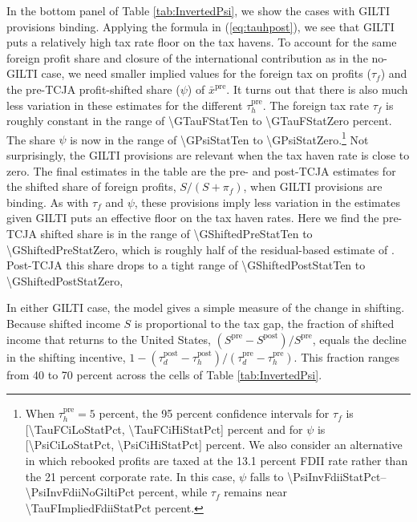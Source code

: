 \documentclass[11pt,letterpaper]{article}
\newcommand{\RoundNum}[1]{\num[round-mode=places,round-precision=0]{#1}}
\begin{document}
In the bottom panel of Table \ref{tab:InvertedPsi}, we show the cases with
GILTI provisions binding.  Applying the formula in
(\ref{eq:tauhpost}), we see that GILTI puts a relatively 
high tax rate floor on the tax havens. To account for the same foreign profit
share and closure of the international contribution as in the no-GILTI case, 
we need smaller implied values for the  foreign tax on profits ($\tau_f$) and 
the pre-TCJA profit-shifted share ($\psi$) of $\bar x^{\text{pre}}$.
It turns out that there is also much less variation in these estimates
for the different $\tau_h^{\text{pre}}$. The foreign tax rate $\tau_f$ is roughly constant
in the range of \RoundNum{\GTauFStatTen} to \RoundNum{\GTauFStatZero}
percent. The share $\psi$ is now in the range of
\RoundNum{\GPsiStatTen} to \RoundNum{\GPsiStatZero}.\footnote{%
When $\tau_h^{\text{pre}}=5$ percent, the 95 percent confidence intervals for $\tau_f$ is
[\RoundNum{\TauFCiLoStatPct}, \RoundNum{\TauFCiHiStatPct}] percent 
and for $\psi$ is
[\RoundNum{\PsiCiLoStatPct}, \RoundNum{\PsiCiHiStatPct}] percent.
We also consider an alternative in which rebooked profits are taxed at the 13.1 percent FDII 
rate rather than the 21 percent corporate rate. 
In this case, $\psi$ falls to \RoundNum{\PsiInvFdiiStatPct}--\RoundNum{\PsiInvFdiiNoGiltiPct} 
percent, while $\tau_f$ remains near \RoundNum{\TauFImpliedFdiiStatPct} percent.}
Not surprisingly, the GILTI provisions are relevant when the
tax haven rate is close to zero.
The final estimates in the table are the 
pre- and post-TCJA estimates for the shifted share of foreign 
profits, $S/(S+\pi_f)$, when GILTI provisions are binding.  As with $\tau_f$ and
$\psi$, these provisions imply less variation in the estimates
given GILTI puts an effective floor on the tax haven rates.
Here we find the pre-TCJA shifted share is 
in the range of \RoundNum{\GShiftedPreStatTen} to \RoundNum{\GShiftedPreStatZero},
which is roughly half of the residual-based estimate of \citet{TorslovWierZucman2023}.
Post-TCJA this share drops to a tight range of
\RoundNum{\GShiftedPostStatTen} to \RoundNum{\GShiftedPostStatZero},

In either GILTI case, the model gives a simple measure of the change in shifting.
Because shifted income $S$ is proportional to the tax gap, the fraction of
shifted income that returns to the United States,
$(S^{\text{pre}}-S^{\text{post}})/S^{\text{pre}}$, equals the decline in the
shifting incentive,
$1-(\tau_d^{\text{post}}-\tau_h^{\text{post}})/
(\tau_d^{\text{pre}}-\tau_h^{\text{pre}})$. This fraction ranges from 40 to
70 percent across the cells of Table \ref{tab:InvertedPsi}.
\end{document}

